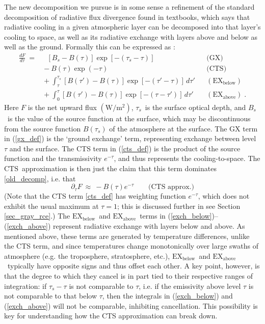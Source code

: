 \documentclass{ametsoc}
\newcommand{\beqn}{\begin{equation}}
\newcommand{\eeqn}{\end{equation}}
\newcommand{\eqnref}[1]{(\ref{#1})}
\newcommand{\meter}{\ensuremath{\mathrm{m}}}
\newcommand{\ddtau}[1]{\ensuremath{\frac{d #1}{d\tau}}}
\newcommand{\pptau}{\ensuremath{\partial_\tau}}
\newcommand{\taus}{\ensuremath{\tau_s}}
\newcommand{\Bs}{\ensuremath{B_s}}
\newcommand{\CTS}{\ensuremath{\mathrm{CTS}}}
\newcommand{\EXbelow}{\ensuremath{\mathrm{EX_{below}}}}
\newcommand{\EXabove}{\ensuremath{\mathrm{EX_{above}}}}
\begin{document}
The new decomposition we pursue is in some sense a refinement of the standard decomposition of radiative flux divergence  found in textbooks, which says that radiative cooling in a given atmospheric layer can be decomposed into that layer's cooling to space, as well as its radiative exchange with layers above and below as well as the ground. Formally this can be expressed as \citep[e.g.][]{petty2006,thomas2002,green1967,rodgers1966}:
	\begin{subequations}
	\begin{align}
			\ddtau{F} \ =\  & \ \   [\Bs-B(\tau)]\exp[-(\taus-\tau)] 
											&& \text{(GX)}  \label{gx_def} \\
								& -\  B(\tau)\exp(-\tau)
											& & \text{(CTS)} \label{cts_def} \\
								& +\ \int_\tau^{\taus} [B(\tau')-B(\tau)]\exp[-(\tau'-\tau)] \, d\tau' 
											& &(\EXbelow)  \label{exch_below}  \\
								& +\  \int_0^{\tau} [B(\tau')-B(\tau)]\exp[-(\tau-\tau')] \, d\tau'  
											& &(\EXabove) \; .  \label{exch_above} 
		\end{align}
		\label{old_decomp}
	\end{subequations}
Here $F$ is the net upward flux $(\mathrm{W}/\meter^2)$, \taus\ is the surface optical depth, and \Bs\ is the value of the source function at the surface, which may be discontinuous from the source function $B(\taus)$ of the atmosphere at the surface. The GX term in \eqnref{gx_def}  is  the `ground exchange' term,  representing exchange between level $\tau$ and the surface. The CTS term in \eqnref{cts_def} is  the product of the source function and the transmissivity $e^{-\tau}$, and thus represents the cooling-to-space. The \CTS\ approximation is then just the claim that this term dominates \eqref{old_decomp},  i.e. that
\beqn
	\pptau F \ \approx \  - B(\tau)e^{-\tau}  \quad \quad   \text{(CTS approx.)} 
	\label{cts_approx}
\eeqn
(Note that the CTS term  \eqref{cts_def} has weighting function $e^{-\tau}$, which does not exhibit the usual maximum at $\tau=1$; this is discussed further in see Section \ref{sec_gray_rce}.) The \EXbelow\ and \EXabove\  terms in \eqnref{exch_below}--\eqnref{exch_above} represent radiative exchange  with layers below and above. As mentioned above, these terms are generated by temperature differences, unlike the CTS term, and since temperatures change monotonically over large swaths of atmosphere (e.g. the troposphere, stratosphere, etc.), \EXbelow\ and \EXabove\ typically have opposite signs and thus offset each other. A key point, however, is that the degree to which they cancel is in part tied to their respective ranges of integration: if $\taus-\tau$ is not comparable to $\tau$, i.e. if the emissivity above level $\tau$ is not comparable to that below $\tau$, then the integrals in \eqnref{exch_below} and \eqnref{exch_above} will not be comparable, inhibiting cancellation. This possibility is key for understanding how the CTS approximation can break down. 
\end{document}
